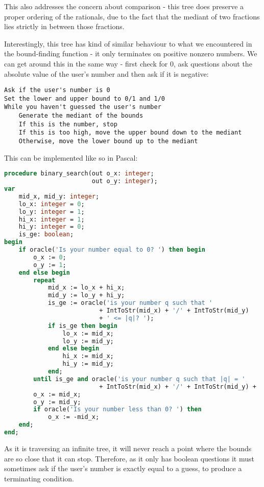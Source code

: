 \documentclass[fleqn,a4paper,11pt]{article}
\begin{document}
    This also addresses the concern about comparison - this tree does preserve a
    proper ordering of the rationals, due to the fact that the mediant of two
    fractions lies strictly in between those fractions.

    Interestingly, this tree has kind of similar behaviour to what we
    encountered in the bound-finding function - it only terminates on positive
    nonzero numbers. We can get around this in the same way - first check for 0,
    ask questions about the absolute value of the user's number and then ask if
    it is negative:

\begin{lstlisting}[caption=Binary search on $\mathbb{Q}$ in pseudocode]
Ask if the user's number is 0
Set the lower and upper bound to 0/1 and 1/0
While you haven't guessed the user's number
    Generate the mediant of the bounds
    If this is the number, stop
    If this is too high, move the upper bound down to the mediant
    Otherwise, move the lower bound up to the mediant
\end{lstlisting}

    This can be implemented like so in Pascal:

\begin{lstlisting}[language=Pascal, caption=Binary search on $\mathbb{Q}$ in Pascal]
procedure binary_search(out o_x: integer;
                        out o_y: integer);
var
    mid_x, mid_y: integer;
    lo_x: integer = 0;
    lo_y: integer = 1;
    hi_x: integer = 1;
    hi_y: integer = 0;
    is_ge: boolean;
begin
    if oracle('Is your number equal to 0? ') then begin
        o_x := 0;
        o_y := 1;
    end else begin
        repeat
            mid_x := lo_x + hi_x;
            mid_y := lo_y + hi_y;
            is_ge := oracle('is your number q such that '
                          + IntToStr(mid_x) + '/' + IntToStr(mid_y)
                          + ' <= |q|? ');
            if is_ge then begin
                lo_x := mid_x;
                lo_y := mid_y;
            end else begin
                hi_x := mid_x;
                hi_y := mid_y;
            end;
        until is_ge and oracle('is your number q such that |q| = '
                          + IntToStr(mid_x) + '/' + IntToStr(mid_y) + '? ');
        o_x := mid_x;
        o_y := mid_y;
        if oracle('Is your number less than 0? ') then
            o_x := -mid_x;
    end;
end;
\end{lstlisting}

    As it is traversing an infinite tree, it will never reach a point where the
    bounds are so close that it can stop. Therefore, as it only has boolean
    questions it must sometimes ask if the user's number is exactly equal to a
    guess, to produce a terminating condition.
\end{document}
